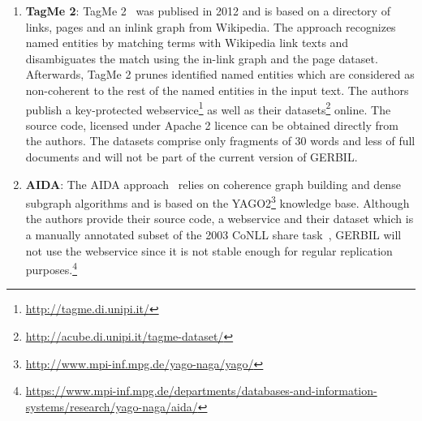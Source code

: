 \begin{enumerate}
\item \textbf{TagMe 2}: TagMe 2~\cite{TagMe2} was publised in 2012 and is based on a directory of links, pages and an inlink graph from Wikipedia.
The approach recognizes named entities by matching terms with Wikipedia link texts and disambiguates the match using the in-link graph and the page dataset.
Afterwards, TagMe 2 prunes identified named entities which are considered as non-coherent to the rest of the named entities in the input text.  
The authors publish a key-protected webservice\footnote{\url{http://tagme.di.unipi.it/}} as well as their datasets\footnote{\url{http://acube.di.unipi.it/tagme-dataset/}} online.
The source code, licensed under Apache 2 licence can be obtained directly from the authors.
The datasets comprise only fragments of 30 words and less of full documents and will not be part of the current version of GERBIL. 

\item \textbf{AIDA}: The AIDA approach~\cite{AIDA} relies on coherence graph building and dense subgraph algorithms and is based on the YAGO2\footnote{\url{http://www.mpi-inf.mpg.de/yago-naga/yago/}} knowledge base.
Although the authors provide their source code, a webservice and their dataset which is a manually annotated subset of the 2003 CoNLL share task~\cite{conll2003}, GERBIL will not use the webservice since it is not stable enough for regular replication purposes.\footnote{\url{https://www.mpi-inf.mpg.de/departments/databases-and-information-systems/research/yago-naga/aida/}}



\end{enumerate}
